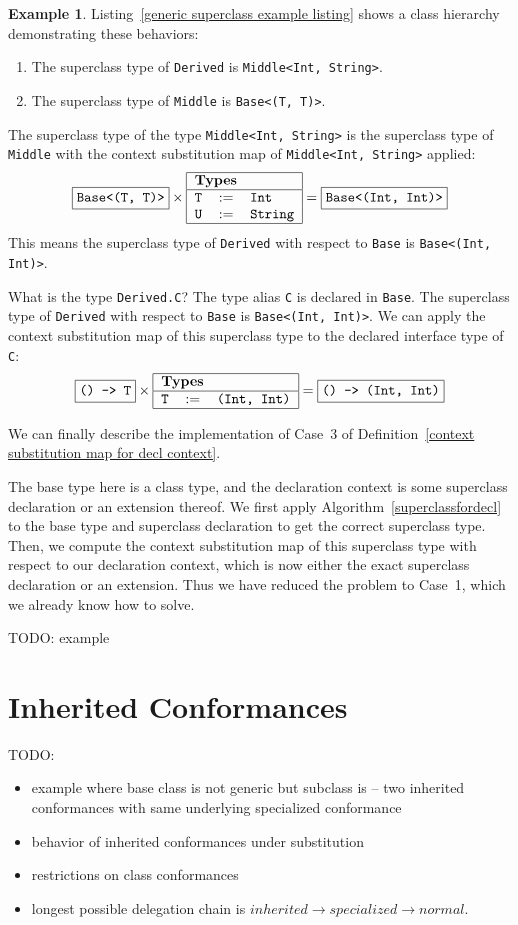 \documentclass[a4paper,headsepline,bibliography=totoc,toc=flat,fleqn,twoside=semi]{scrbook}
\theoremstyle{definition}
\theoremstyle{definition}
\newtheorem{example}{Example}[chapter]
\theoremstyle{definition}
\newcommand{\ttbox}[1]{\boxed{\mbox{\vphantom{pI\texttt{pI}}\texttt{#1}}}}
\newcommand{\SubMap}[1]{\begin{tabular}{|lll|}
\hline
\multicolumn{3}{|l|}{\textbf{Types}}\\
\hline
#1\\
\hline
\end{tabular}}
\newcommand{\SubType}[2]{\texttt{#1}&$:=$&\texttt{#2}}
\newcommand{\ifWIP}{\iffalse}
\begin{document}
\begin{example}\label{genericsuperclassexample}
Listing~\ref{generic superclass example listing} shows a class hierarchy demonstrating these behaviors:
\begin{enumerate}
\item The superclass type of \texttt{Derived} is \texttt{Middle<Int, String>}.
\item The superclass type of \texttt{Middle} is \texttt{Base<(T, T)>}.
\end{enumerate}
The superclass type of the type \texttt{Middle<Int, String>} is the superclass type of \texttt{Middle} with the context substitution map of \texttt{Middle<Int, String>} applied:
\[\ttbox{Base<(T, T)>}\times
\SubMap{
\SubType{T}{Int}\\
\SubType{U}{String}
} = \ttbox{Base<(Int, Int)>}
\]
This means the superclass type of \texttt{Derived} with respect to \texttt{Base} is \texttt{Base<(Int, Int)>}.

What is the type \texttt{Derived.C}? The type alias \texttt{C} is declared in \texttt{Base}. The superclass type of \texttt{Derived} with respect to \texttt{Base} is \texttt{Base<(Int, Int)>}. We can apply the context substitution map of this superclass type to the declared interface type of \texttt{C}:
\[\ttbox{() -> T}\times
\SubMap{
\SubType{T}{(Int, Int)}
} = \ttbox{() -> (Int, Int)}
\]
\end{example}

We can finally describe the implementation of Case~3 of Definition~\ref{context substitution map for decl context}.

The base type here is a class type, and the declaration context is some superclass declaration or an extension thereof. We first apply Algorithm~\ref{superclassfordecl} to the base type and superclass declaration to get the correct superclass type. Then, we compute the context substitution map of this superclass type with respect to our declaration context, which is now either the exact superclass declaration or an extension. Thus we have reduced the problem to Case~1, which we already know how to solve.

TODO: example
\fi

\section{Inherited Conformances}\label{inheritedconformance}

\ifWIP

TODO:
\begin{itemize}
\item example where base class is not generic but subclass is -- two inherited conformances with same underlying specialized conformance
\item behavior of inherited conformances under substitution
\item restrictions on class conformances
\item longest possible delegation chain is $inherited \rightarrow specialized \rightarrow normal$.
\end{itemize}
\end{document}
